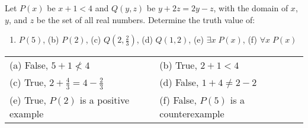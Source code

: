 \documentclass[12pt,addpoints]{exam}
\begin{document}
\begin{questions}
\question[6] Let $P(x)$ be $x + 1 < 4$ and $Q(y,z)$ be $y + 2z = 2y - z$, with the domain of $x$, $y$, and $z$ be the set of all real numbers.  Determine the truth value of:
\begin{enumerate}[label=(\alph*),itemsep=0pt,parsep=0pt,
	topsep=0pt,partopsep=0pt]
    \item $P(5)$, \hspace{0.2in} (b) $P(2)$, \hspace{0.2in} (c) $Q(2, \frac{2}{3})$, 
    	\hspace{0.2in} (d) $Q(1, 2)$, \hspace{0.2in} (e) $\exists x\; P(x)$, \hspace{0.2in} (f) $\forall x\; P(x)$
\end{enumerate}
    \ifprintanswers
        \vspace{-12pt}
    \fi
\begin{solution}
	\begin{tabular}{ll}
		(a) False, $5 + 1 \not < 4$  & (b) True,  $2 + 1 < 4$ \\
		(c) True, $ 2 + \frac{4}{3} = 4 - \frac{2}{3}$ & (d) False, $1 + 4 \neq 2 - 2$ \\ 
		(e) True, $P(2)$ is a positive example & (f) False, $P(5)$ is a counterexample 
	\end{tabular}
\end{solution}



\end{questions}
\end{document}
